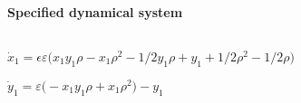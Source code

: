 
\begin{math}
\end{math}
\paragraph{Specified dynamical system}
\begin{math}
\end{math}\par

\begin{math}
\dot x_{1}=\epsilon  \varepsilon  \big(x_{1} y_{1} \rho -x_{1} \rho ^{2}
-1/2 y_{1} \rho +y_{1}+1/2 \rho ^{2}-1/2 \rho \big)
\end{math}\par

\begin{math}
\dot y_{1}=\varepsilon  \big(-x_{1} y_{1} \rho +x_{1} \rho ^{2}\big)-y_{
1}
\end{math}\par

